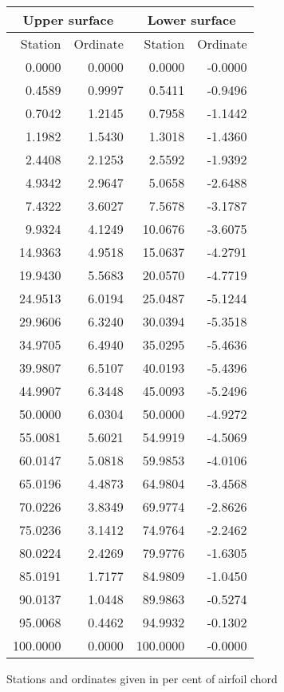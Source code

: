 \documentclass[11pt]{book}
\begin{document}
 \hspace{4mm}
 \begin{tabular}{|r|r|r|r|} \hline 
 \multicolumn{2}{|c|}{Upper surface} & \multicolumn{2}{|c|}{Lower surface} \\
 \hline
 Station & Ordinate & Station & Ordinate \\
 \hline
0.0000 & 0.0000 & 0.0000 & -0.0000 \\
0.4589 & 0.9997 & 0.5411 & -0.9496 \\
0.7042 & 1.2145 & 0.7958 & -1.1442 \\
1.1982 & 1.5430 & 1.3018 & -1.4360 \\
2.4408 & 2.1253 & 2.5592 & -1.9392 \\
4.9342 & 2.9647 & 5.0658 & -2.6488 \\
7.4322 & 3.6027 & 7.5678 & -3.1787 \\
9.9324 & 4.1249 & 10.0676 & -3.6075 \\
14.9363 & 4.9518 & 15.0637 & -4.2791 \\
19.9430 & 5.5683 & 20.0570 & -4.7719 \\
24.9513 & 6.0194 & 25.0487 & -5.1244 \\
29.9606 & 6.3240 & 30.0394 & -5.3518 \\
34.9705 & 6.4940 & 35.0295 & -5.4636 \\
39.9807 & 6.5107 & 40.0193 & -5.4396 \\
44.9907 & 6.3448 & 45.0093 & -5.2496 \\
50.0000 & 6.0304 & 50.0000 & -4.9272 \\
55.0081 & 5.6021 & 54.9919 & -4.5069 \\
60.0147 & 5.0818 & 59.9853 & -4.0106 \\
65.0196 & 4.4873 & 64.9804 & -3.4568 \\
70.0226 & 3.8349 & 69.9774 & -2.8626 \\
75.0236 & 3.1412 & 74.9764 & -2.2462 \\
80.0224 & 2.4269 & 79.9776 & -1.6305 \\
85.0191 & 1.7177 & 84.9809 & -1.0450 \\
90.0137 & 1.0448 & 89.9863 & -0.5274 \\
95.0068 & 0.4462 & 94.9932 & -0.1302 \\
100.0000 & 0.0000 & 100.0000 & -0.0000 \\
 \hline 
 \end{tabular}
 \vspace{8mm}

Stations and ordinates given in per cent of airfoil chord
\end{document}
